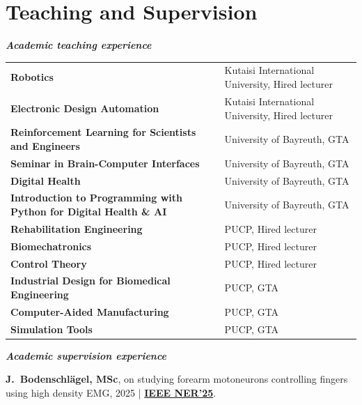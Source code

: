 \documentclass[a4paper,10pt]{article}
\begin{document}
\section{Teaching and Supervision}

\textbf{\textit{Academic teaching experience}}

\vspace{2pt}
\begin{tabular}{@{}ll}
  \textbf{Robotics} & Kutaisi International University, Hired lecturer\\
  \textbf{Electronic Design Automation} & Kutaisi International University, Hired lecturer\\
  \textbf{Reinforcement Learning for Scientists and Engineers} & University of Bayreuth, GTA\\
  \textbf{Seminar in Brain-Computer Interfaces}                 & University of Bayreuth, GTA\\
  \textbf{Digital Health}                                       & University of Bayreuth, GTA\\
  \textbf{Introduction to Programming with Python for Digital Health \& AI}
                                                                & University of Bayreuth, GTA\\
  \textbf{Rehabilitation Engineering}
    & PUCP, Hired lecturer\\
  \textbf{Biomechatronics}
    & PUCP, Hired lecturer\\
  \textbf{Control Theory}
    & PUCP, Hired lecturer\\
  \textbf{Industrial Design for Biomedical Engineering}         & PUCP, GTA\\
  \textbf{Computer-Aided Manufacturing}                         & PUCP, GTA\\
  \textbf{Simulation Tools}                                     & PUCP, GTA\\
\end{tabular}

\vspace{4pt}
\textbf{\textit{Academic supervision experience}}

\vspace{2pt}
\textbf{J.\ Bodenschl\"agel, MSc}, on studying forearm motoneurons controlling fingers using
high density EMG, 2025 |
\href{https://cmsfiles.s3.amazonaws.com/ner2025/proceedings/61569_CFP25CNE-ART/pdfs/0000634.pdf}{\textbf{IEEE NER'25}}.
\end{document}
